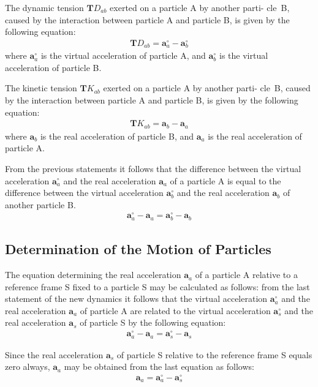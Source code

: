 \documentclass[11pt]{article}
\newcommand{\vA}{\mathbf{a}}
\newcommand{\vT}{\mathbf{T}}
\newcommand{\nK}{{\scriptstyle K}}
\newcommand{\nD}{{\scriptstyle D}}
\newcommand{\ra}{_a}
\newcommand{\rb}{_b}
\newcommand{\rs}{_s}
\newcommand{\rab}{_{ab}}
\begin{document}
\par The dynamic tension $\vT\nD\rab$ exerted on a particle A by another parti- \hbox {cle B}, caused by the interaction between particle A and particle B, is given by the following equation:
\begin{eqnarray*}
\vT\nD\rab = \vA^{\circ}\ra - \vA^{\circ}\rb
\end{eqnarray*}
\noindent where $\vA^{\circ}\ra$ is the virtual acceleration of particle A, and $\vA^{\circ}\rb$ is the virtual acceleration of particle B.
\par The kinetic tension $\vT\nK\rab$ exerted on a particle A by another parti- \hbox {cle B}, caused by the interaction between particle A and particle B, is given by the following equation:
\begin{eqnarray*}
\vT\nK\rab = \vA\rb - \vA\ra
\end{eqnarray*}
\noindent where $\vA\rb$ is the real acceleration of particle B, and $\vA\ra$ is the real acceleration of particle A.
\par From the previous statements it follows that the difference between the virtual acceleration $\vA^{\circ}\ra$ and the real acceleration $\vA\ra$ of a particle A is equal to the difference between the virtual acceleration $\vA^{\circ}\rb$ and the real acceleration $\vA\rb$ of another particle B.
\begin{eqnarray*}
\vA^{\circ}\ra - \vA\ra = \vA^{\circ}\rb - \vA\rb
\end{eqnarray*}

\medskip

{\centering\subsection*{Determination of the Motion of Particles}}

\par The equation determining the real acceleration $\vA\ra$ of a particle A relative to a reference frame S fixed to a particle S may be calculated as follows: from the last statement of the new dynamics it follows that the virtual acceleration $\vA^{\circ}\ra$ and the real acceleration $\vA\ra$ of particle A are related to the virtual acceleration $\vA^{\circ}\rs$ and the real acceleration $\vA\rs$ of particle S by the following equation:
\begin{eqnarray*}
\vA^{\circ}\ra - \vA\ra = \vA^{\circ}\rs - \vA\rs
\end{eqnarray*}
\par Since the real acceleration $\vA\rs$ of particle S relative to the reference frame S equals zero always, $\vA\ra$ may be obtained from the last equation as follows:
\begin{eqnarray*}
\vA\ra = \vA^{\circ}\ra - \vA^{\circ}\rs
\end{eqnarray*}
\end{document}
